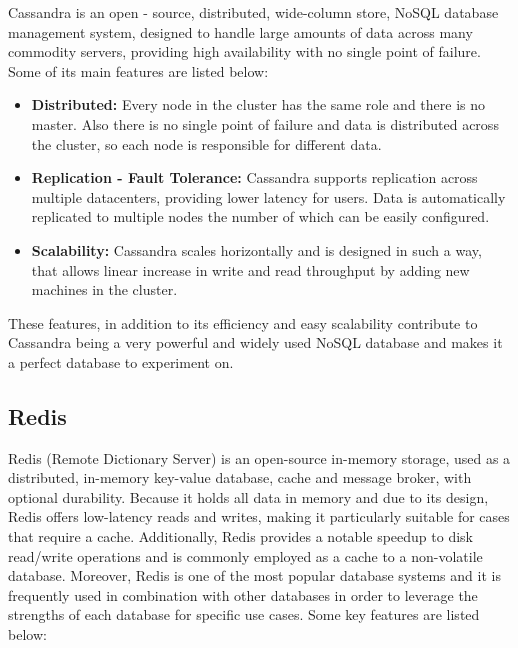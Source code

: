 \documentclass[conference]{IEEEtran}
\begin{document}
Cassandra is an open - source, distributed, wide-column store, NoSQL database management system, designed to handle large amounts of data across many commodity servers,
providing high availability with no single point of failure. Some of its main features are listed below:

\begin{itemize}
    \item \textbf{Distributed:} Every node in the cluster has the same role and there is no master. Also there is no single point of failure and data is distributed across the cluster, so 
    each node is responsible for different data.
    \item \textbf{Replication - Fault Tolerance:} Cassandra supports replication across multiple datacenters, providing lower latency for users. Data is automatically replicated to multiple nodes the number
    of which can be easily configured.
    \item \textbf{Scalability:} Cassandra scales horizontally and is designed in such a way, that allows linear increase in write and read throughput by adding new machines in the cluster.
\end{itemize}

These features, in addition to its efficiency and easy scalability contribute to Cassandra being a very powerful and widely used NoSQL database and makes it a perfect database to experiment on. 

\subsection{Redis}

Redis (Remote Dictionary Server) is an open-source in-memory storage, used as a distributed, in-memory key-value database, cache and message broker, with optional durability. Because it holds all
data in memory and due to its design, Redis offers low-latency reads and writes, making it particularly suitable for cases that require a cache. Additionally, Redis provides a notable speedup to disk
read/write operations and is commonly employed as a cache to a non-volatile database. Moreover, Redis is one of the most popular database systems and
it is frequently used in combination with other databases in order to leverage the strengths of each database for specific use cases. Some key features are listed below:
\end{document}

